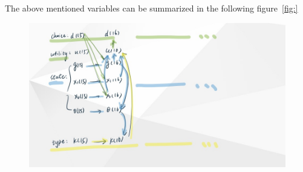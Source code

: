\documentclass[12pt]{article}
\begin{document}
The above mentioned variables can be summarized in the following figure~\ref{fig:}
\begin{figure}
    \centering
    \includegraphics[]{../Figures/viz.jpg}
\end{figure}
\end{document}
